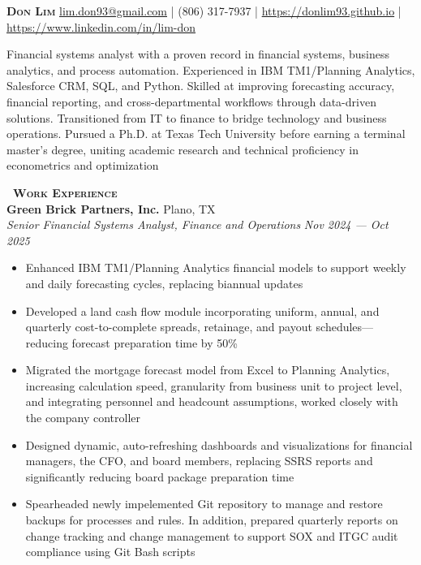\documentclass[a4paper,11pt]{article}
\newcommand{\header} [1] {
    \vspace{0.5mm}
    {\textsc{\textbf{\Large{\xrfill[0.5ex]{0.5pt}~#1~\xrfill[0.5ex]{0.5pt}}}}} %
}
\begin{document}
\vspace*{-0.45in}
\fontsize{10.5}{11.5}\selectfont

\begin{raggedright}
    {\Huge\textbf\textsc{{{Don Lim}}}} \hfill
    \href{mailto:lim.don93@gmail.com}{lim.don93@gmail.com} | (806) 317-7937 | \href{https://donlim93.github.io/}{https://donlim93.github.io} | \href{https://www.linkedin.com/in/lim-don/}{https://www.linkedin.com/in/lim-don} \\ \vspace{2mm}
\end{raggedright}

Financial systems analyst with a proven record in financial systems, business analytics, and process automation. Experienced in IBM TM1/Planning Analytics, Salesforce CRM, SQL, and Python. Skilled at improving forecasting accuracy, financial reporting, and cross-departmental workflows through data-driven solutions. Transitioned from IT to finance to bridge technology and business operations. Pursued a Ph.D. at Texas Tech University before earning a terminal master’s degree, uniting academic research and technical proficiency in econometrics and optimization \\

\vspace{0.5mm}
\header{Work Experience} \\
\vspace{0.5mm}
\textbf{Green Brick Partners, Inc.} \hfill Plano, TX \\
\textit{Senior Financial Systems Analyst, Finance and Operations} \hfill \textit{Nov 2024 --- Oct 2025} \\
\begin{itemize}
    \item Enhanced IBM TM1/Planning Analytics financial models to support weekly and daily forecasting cycles, replacing biannual updates
    \item Developed a land cash flow module incorporating uniform, annual, and quarterly cost-to-complete spreads, retainage, and payout schedules—reducing forecast preparation time by 50\%
    \item Migrated the mortgage forecast model from Excel to Planning Analytics, increasing calculation speed, granularity from business unit to project level, and integrating personnel and headcount assumptions, worked closely with the company controller
    \item Designed dynamic, auto-refreshing dashboards and visualizations for financial managers, the CFO, and board members, replacing SSRS reports and significantly reducing board package preparation time
    \item Spearheaded newly impelemented Git repository to manage and restore backups for processes and rules. In addition, prepared quarterly reports on change tracking and change management to support SOX and ITGC audit compliance using Git Bash scripts
\end{itemize}
\vspace{0.5mm}
\end{document}
